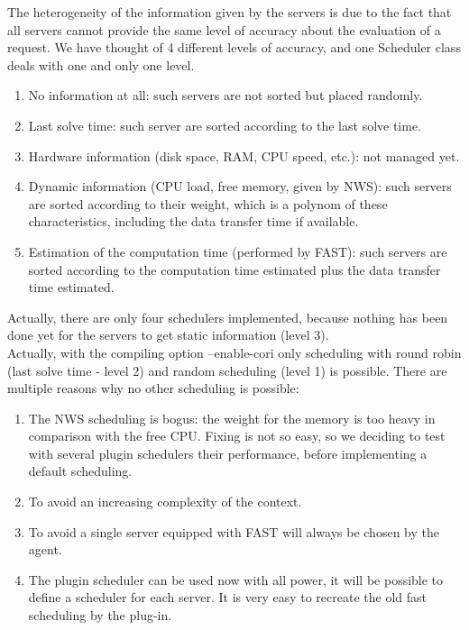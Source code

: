   The heterogeneity of the information given by the servers is due to the fact
  that all servers cannot provide the same level of accuracy about the evaluation
  of a request. We have thought of 4 different levels of accuracy, and one
  \textsf{Scheduler} class deals with one and only one level.
  \begin{enumerate}
  \item No information at all: such servers are not sorted but placed randomly.
  \item Last solve time: such server are sorted according to the last solve time.
  \item Hardware information (disk space, RAM, CPU speed, etc.): not managed yet.
  \item Dynamic information (CPU load, free memory, given by NWS): such servers
  are sorted according to their weight, which is a polynom of these
  characteristics, including the data transfer time if available.
  \item Estimation of the computation time (performed by FAST): such servers
  are sorted according to the computation time estimated plus the data transfer
  time estimated.
  \end{enumerate}

  Actually, there are only four schedulers implemented, because nothing has been
  done yet for the servers to get static information (level 3).\\
  Actually, with the compiling option --enable-cori only scheduling with round
  robin (last solve time - level 2) and random scheduling (level 1) is possible.
  There are multiple reasons why no other scheduling is possible:
\begin{enumerate}
  \item The NWS scheduling is bogus: the weight for the memory is too
  heavy in comparison with the free CPU. Fixing is not so easy, so
  we deciding to test with several plugin schedulers their
  performance, before implementing a default scheduling.
  \item To avoid an increasing complexity of the context.
  \item To avoid a single server equipped with FAST will always be chosen by
  the agent.
  \item The plugin scheduler can be used now with all power, it will
  be possible to define a scheduler for each server. It is very easy to recreate the old 
fast scheduling by the plug-in.
  \end{enumerate}


